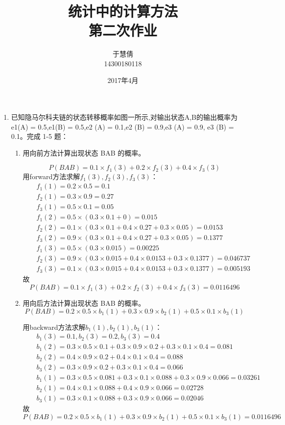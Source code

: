 \documentclass{ctexart}
\title{统计中的计算方法 \\ 第二次作业}
\author{于慧倩 \\ 14300180118}
\date{2017年4月}
\begin{document}
\maketitle

\newpage

\begin{enumerate}

\item
已知隐马尔科夫链的状态转移概率如图一所示,对输出状态{A,B}的输出概率为e1(A) = 0.5,e1(B) = 0.5,e2 (A) = 0.1,e2 (B) = 0.9,e3 (A) = 0.9, e3 (B) = 0.1。完成 1-5 题：

\begin{enumerate}
\item 用向前方法计算出现状态 BAB 的概率。

\[P(BAB)=0.1\times f_1(3)+0.2 \times f_2(3)+0.4 \times f_3(3)\]
用forward方法求解\(f_1(3),f_2(3),f_3(3)\)：
\begin{eqnarray*}
& &f_1(1)=0.2\times0.5=0.1\\
& &f_2(1)=0.3\times0.9=0.27\\
& &f_3(1)=0.5 \times 0.1=0.05\\
& &f_1(2)=0.5\times(0.3\times0.1+0)=0.015\\
& &f_2(2)=0.1\times(0.3\times0.1+0.4\times0.27+0.3\times0.05)=0.0153\\
& &f_3(2)=0.9\times(0.3\times0.1+0.4\times0.27+0.3\times0.05)=0.1377\\
& &f_1(3)=0.5\times(0.3\times0.015)=0.00225\\
& &f_2(3)=0.9\times(0.3\times0.015+0.4\times0.0153+0.3\times0.1377)=0.046737\\
& &f_3(3)=0.1\times(0.3\times0.015+0.4\times0.0153+0.3\times0.1377)=0.005193
\end{eqnarray*}
故
\[P(BAB)=0.1\times f_1(3)+0.2 \times f_2(3)+0.4 \times f_3(3)=0.0116496\]


\item 用向后方法计算出现状态 BAB 的概率。
\[P(BAB)=0.2\times0.5\times b_1(1)+0.3\times0.9\times b_2(1)+0.5\times0.1\times b_3(1)\]

用backward方法求解\(b_1(1),b_2(1),b_3(1)\)：
\begin{eqnarray*}
& &b_1(3)=0.1,b_2(3)=0.2,b_3(3)=0.4\\
& &b_1(2)=0.3\times0.5\times0.1+0.3\times0.9\times0.2+0.3\times0.1\times0.4=0.081\\
& &b_2(2)=0.4\times0.9\times0.2+0.4\times0.1\times0.4=0.088\\
& &b_3(2)=0.3\times0.9\times0.2+0.3\times0.1\times0.4=0.066\\
& &b_1(1)=0.3\times0.5\times 0.081+0.3\times0.1\times0.088+0.3\times0.9\times0.066=0.03261\\
& &b_2(1)=0.4\times0.1\times0.088+0.4\times0.9\times0.066=0.02728\\
& &b_3(1)=0.3\times0.1\times0.088+0.3\times0.9\times0.066=0.02046
\end{eqnarray*}
故
\[P(BAB)=0.2\times0.5\times b_1(1)+0.3\times0.9\times b_2(1)+0.5\times0.1\times b_3(1)=0.0116496\]





\end{enumerate}
\end{enumerate}
\end{document}
